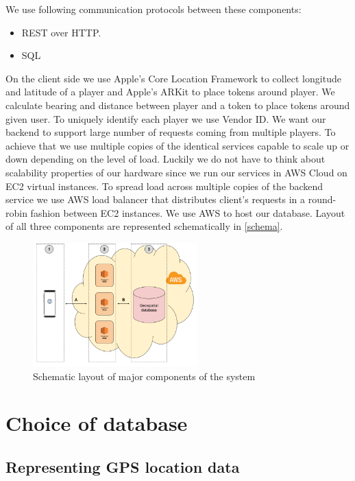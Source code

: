 \documentclass[conference]{IEEEtran}
\begin{document}
We use following communication protocols between these components:

\begin{itemize}
\item REST over HTTP. 
\item SQL 
\end{itemize}

On the client side we use Apple’s Core Location Framework to collect longitude and latitude of a player and Apple’s ARKit to place tokens around player. We calculate bearing and distance between player and a token to place tokens around given user. To uniquely identify each player we use Vendor ID.
We want our backend to support large number of requests coming from multiple players. To achieve that we use multiple copies of the identical services capable to scale up or down depending on the level of load. Luckily we do not have to think about scalability properties of our hardware since we run our services in AWS Cloud on EC2 virtual instances.  To spread load across multiple copies of the backend service we use AWS load balancer that distributes client’s requests in a round-robin fashion between EC2 instances. 
We use AWS to host our database. 
Layout of all three components are represented schematically in \autoref{schema}. 

\begin{figure}
\centering
\includegraphics[width=2.5in]{imgs/systemschema.png}
\caption{Schematic layout of major components of the system}
\label{schema}
\end{figure}

\section{Choice of database}
\subsection{Representing GPS location data}
\end{document}
